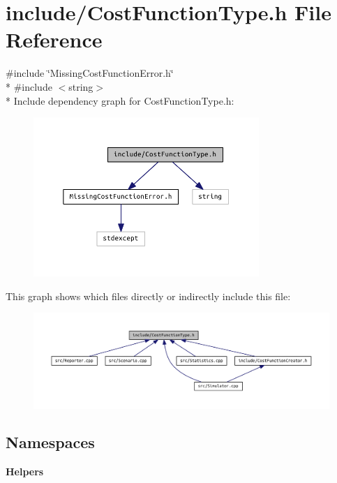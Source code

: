 \section{include/\+Cost\+Function\+Type.h File Reference}
\label{_cost_function_type_8h}
{\ttfamily \#include \char`\"{}Missing\+Cost\+Function\+Error.\+h\char`\"{}}\\*
{\ttfamily \#include $<$string$>$}\\*
Include dependency graph for Cost\+Function\+Type.\+h\+:\nopagebreak
\begin{figure}[H]
\begin{center}
\leavevmode
\includegraphics[width=242pt]{_cost_function_type_8h__incl}
\end{center}
\end{figure}
This graph shows which files directly or indirectly include this file\+:\nopagebreak
\begin{figure}[H]
\begin{center}
\leavevmode
\includegraphics[width=350pt]{_cost_function_type_8h__dep__incl}
\end{center}
\end{figure}
\subsection*{Namespaces}
\begin{DoxyCompactItemize}
\item 
 {\bf Helpers}
\end{DoxyCompactItemize}
